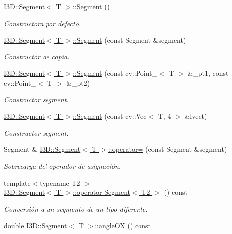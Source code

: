 \begin{DoxyCompactItemize}
\hyperlink{group___geometric_entities_gac1c7a78862638e88bd9d9f512d6acc49}{I3\+D\+::\+Segment$<$ T $>$\+::\+Segment} ()
\begin{DoxyCompactList}\small\item\em Constructora por defecto. \end{DoxyCompactList}\item 
\hyperlink{group___geometric_entities_ga39a1c7ab363a4531d780dd35b6fc79f6}{I3\+D\+::\+Segment$<$ T $>$\+::\+Segment} (const Segment \&segment)
\begin{DoxyCompactList}\small\item\em Constructor de copia. \end{DoxyCompactList}\item 
\hyperlink{group___geometric_entities_ga76e944eff092cf055965199957820f5b}{I3\+D\+::\+Segment$<$ T $>$\+::\+Segment} (const cv\+::\+Point\+\_\+$<$ T $>$ \&\+\_\+pt1, const cv\+::\+Point\+\_\+$<$ T $>$ \&\+\_\+pt2)
\begin{DoxyCompactList}\small\item\em Constructor segment. \end{DoxyCompactList}\item 
\hyperlink{group___geometric_entities_ga01623dcfd1be4e9472390b59e0ca3a58}{I3\+D\+::\+Segment$<$ T $>$\+::\+Segment} (const cv\+::\+Vec$<$ T, 4 $>$ \&lvect)
\begin{DoxyCompactList}\small\item\em Constructor segment. \end{DoxyCompactList}\item 
Segment \& \hyperlink{group___geometric_entities_gad1b2c0a4c4e1ea3c43ee24630eb26f1b}{I3\+D\+::\+Segment$<$ T $>$\+::operator=} (const Segment \&segment)
\begin{DoxyCompactList}\small\item\em Sobrecarga del operador de asignación. \end{DoxyCompactList}\item 
{\footnotesize template$<$typename T2 $>$ }\\\hyperlink{group___geometric_entities_ga363ef30b40d13ee361b9f0e32f135655}{I3\+D\+::\+Segment$<$ T $>$\+::operator Segment$<$ T2 $>$} () const 
\begin{DoxyCompactList}\small\item\em Conversión a un segmento de un tipo diferente. \end{DoxyCompactList}\item 
double \hyperlink{group___geometric_entities_ga911ebe69ce3cc5e6a486ef573d515866}{I3\+D\+::\+Segment$<$ T $>$\+::angle\+OX} () const 

\end{DoxyCompactItemize}
